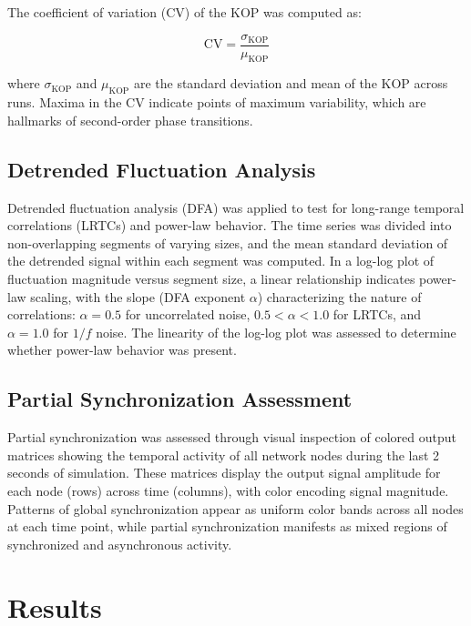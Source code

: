 \documentclass[12pt]{article}
\begin{document}
The coefficient of variation (CV) of the KOP was computed as:

\begin{equation}
\text{CV} = \frac{\sigma_{\text{KOP}}}{\mu_{\text{KOP}}}
\end{equation}

\noindent where $\sigma_{\text{KOP}}$ and $\mu_{\text{KOP}}$ are the standard deviation and mean of the KOP across runs. Maxima in the CV indicate points of maximum variability, which are hallmarks of second-order phase transitions.

\subsection{Detrended Fluctuation Analysis}

Detrended fluctuation analysis (DFA) \citep{peng1994mosaic} was applied to test for long-range temporal correlations (LRTCs) and power-law behavior. The time series was divided into non-overlapping segments of varying sizes, and the mean standard deviation of the detrended signal within each segment was computed. In a log-log plot of fluctuation magnitude versus segment size, a linear relationship indicates power-law scaling, with the slope (DFA exponent $\alpha$) characterizing the nature of correlations: $\alpha = 0.5$ for uncorrelated noise, $0.5 < \alpha < 1.0$ for LRTCs, and $\alpha = 1.0$ for $1/f$ noise. The linearity of the log-log plot was assessed to determine whether power-law behavior was present.

\subsection{Partial Synchronization Assessment}

Partial synchronization was assessed through visual inspection of colored output matrices showing the temporal activity of all network nodes during the last 2 seconds of simulation. These matrices display the output signal amplitude for each node (rows) across time (columns), with color encoding signal magnitude. Patterns of global synchronization appear as uniform color bands across all nodes at each time point, while partial synchronization manifests as mixed regions of synchronized and asynchronous activity.

\section{Results}
\end{document}
